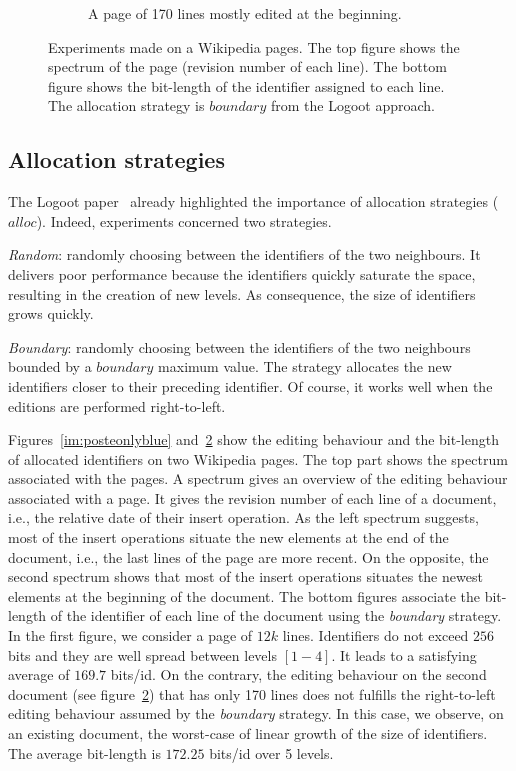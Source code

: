 \begin{figure}
\begin{subfigure}[t]{0.47\textwidth}
\caption{A page of 170 lines mostly edited at the beginning.}
\label{im:didyouknowonlyblue}
\end{subfigure}
\caption{Experiments made on a Wikipedia pages. The top figure shows the
  spectrum of the page (revision number of each line). The bottom figure shows
  the bit-length of the identifier assigned to each line. The allocation
  strategy is $boundary$ from the Logoot approach.}
\end{figure}

\subsection{Allocation strategies}
The Logoot paper~\cite{weiss2009logoot} already highlighted the importance of
allocation strategies ($alloc$). Indeed, experiments concerned two strategies.
\begin{inparaenum}[(1)]
\item \emph{Random}: randomly choosing between the identifiers of the two
  neighbours. It delivers poor performance because the identifiers quickly
  saturate the space, resulting in the creation of new levels. As consequence,
  the size of identifiers grows quickly.
\item \emph{Boundary}: randomly choosing between the identifiers of the two
  neighbours bounded by a $boundary$ maximum value. The strategy allocates the
  new identifiers closer to their preceding identifier. Of course, it works
  well when the editions are performed right-to-left.
\end{inparaenum}

Figures~\ref{im:posteonlyblue} and~\ref{im:didyouknowonlyblue} show the editing
behaviour and the bit-length of allocated identifiers on two Wikipedia
pages. The top part shows the spectrum associated with the pages. A spectrum
gives an overview of the editing behaviour associated with a page. It gives the
revision number of each line of a document, i.e., the relative date of their
insert operation.  As the left spectrum suggests, most of the insert operations
situate the new elements at the end of the document, i.e., the last lines of
the page are more recent. On the opposite, the second spectrum shows that most
of the insert operations situates the newest elements at the beginning of the
document.  The bottom figures associate the bit-length of the identifier of
each line of the document using the \emph{boundary} strategy. In the first
figure, we consider a page of $12k$ lines. Identifiers do not exceed $256$ bits
and they are well spread between levels $[1-4]$. It leads to a satisfying
average of $169.7$ bits/id. On the contrary, the editing behaviour on the
second document (see figure~\ref{im:didyouknowonlyblue}) that has only 170
lines does not fulfills the right-to-left editing behaviour assumed by the
\emph{boundary} strategy. In this case, we observe, on an existing document,
the worst-case of linear growth of the size of identifiers.  The average
bit-length is $172.25$ bits/id over 5 levels.


